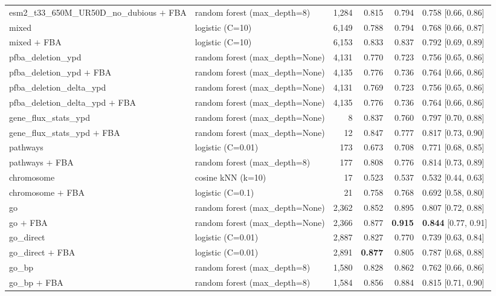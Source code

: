 \begin{longtable}{@{}llrrrl@{}}
    esm2\_t33\_650M\_UR50D\_no\_dubious $+$ FBA & random forest (max\_depth=8) & 1,284 & 0.815 & 0.794 & 0.758 [0.66, 0.86] \\
    mixed & logistic (C=10) & 6,149 & 0.788 & 0.794 & 0.768 [0.66, 0.87] \\
    mixed $+$ FBA & logistic (C=10) & 6,153 & 0.833 & 0.837 & 0.792 [0.69, 0.89] \\
    pfba\_deletion\_ypd & random forest (max\_depth=None) & 4,131 & 0.770 & 0.723 & 0.756 [0.65, 0.86] \\
    pfba\_deletion\_ypd $+$ FBA & random forest (max\_depth=None) & 4,135 & 0.776 & 0.736 & 0.764 [0.66, 0.86] \\
    pfba\_deletion\_delta\_ypd & random forest (max\_depth=None) & 4,131 & 0.769 & 0.723 & 0.756 [0.65, 0.86] \\
    pfba\_deletion\_delta\_ypd $+$ FBA & random forest (max\_depth=None) & 4,135 & 0.776 & 0.736 & 0.764 [0.66, 0.86] \\
    gene\_flux\_stats\_ypd & random forest (max\_depth=None) & 8 & 0.837 & 0.760 & 0.797 [0.70, 0.88] \\
    gene\_flux\_stats\_ypd $+$ FBA & random forest (max\_depth=None) & 12 & 0.847 & 0.777 & 0.817 [0.73, 0.90] \\
    pathways & logistic (C=0.01) & 173 & 0.673 & 0.708 & 0.771 [0.68, 0.85] \\
    pathways $+$ FBA & random forest (max\_depth=8) & 177 & 0.808 & 0.776 & 0.814 [0.73, 0.89] \\
    chromosome & cosine kNN (k=10) & 17 & 0.523 & 0.537 & 0.532 [0.44, 0.63] \\
    chromosome $+$ FBA & logistic (C=0.1) & 21 & 0.758 & 0.768 & 0.692 [0.58, 0.80] \\
    go & random forest (max\_depth=None) & 2,362 & 0.852 & 0.895 & 0.807 [0.72, 0.88] \\
    go $+$ FBA & random forest (max\_depth=None) & 2,366 & 0.877 & \textbf{0.915} & \textbf{0.844} [0.77, 0.91] \\
    go\_direct & logistic (C=0.01) & 2,887 & 0.827 & 0.770 & 0.739 [0.63, 0.84] \\
    go\_direct $+$ FBA & logistic (C=0.01) & 2,891 & \textbf{0.877} & 0.805 & 0.787 [0.68, 0.88] \\
    go\_bp & random forest (max\_depth=8) & 1,580 & 0.828 & 0.862 & 0.762 [0.66, 0.86] \\
    go\_bp $+$ FBA & random forest (max\_depth=8) & 1,584 & 0.856 & 0.884 & 0.815 [0.71, 0.90] \\
\end{longtable}
\endgroup
